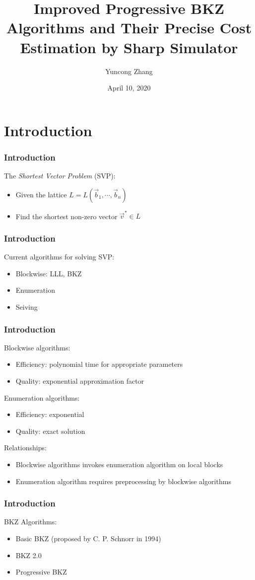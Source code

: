 \documentclass{beamer}
\title{Improved Progressive BKZ Algorithms and Their Precise Cost Estimation by Sharp Simulator}
\author{Yuncong Zhang}
\date{April 10, 2020}
\newcommand{\vb}{\vec{b}}
\newcommand{\vvs}{\vec{v}^*}
\begin{document}
\frame{\titlepage}

\frame{\tableofcontents}

\section{Introduction}
\frame
{
  \frametitle{Introduction}
  The \emph{Shortest Vector Problem} (SVP):
  \begin{itemize}
  	\item Given the lattice $L=L(\vb_1,\cdots,\vb_n)$
  	\item Find the shortest non-zero vector $\vvs\in L$
  \end{itemize}
}

\frame
{
  \frametitle{Introduction}
  Current algorithms for solving SVP:
  \begin{itemize}
  	\item Blockwise: LLL, BKZ
  	\item Enumeration
  	\item Seiving
  \end{itemize}
}

\frame
{
  \frametitle{Introduction}
  Blockwise algorithms:
  \begin{itemize}
  	\item Efficiency: polynomial time for appropriate parameters
  	\item Quality: exponential approximation factor
  \end{itemize}
  Enumeration algorithms:
  \begin{itemize}
  	\item Efficiency: exponential
  	\item Quality: exact solution
  \end{itemize}
  Relationships:
  \begin{itemize}
  	\item Blockwise algorithms invokes enumeration algorithm on local blocks
  	\item Enumeration algorithm requires preprocessing by blockwise algorithms
  \end{itemize}
}

\frame
{
  \frametitle{Introduction}
  BKZ Algorithms:
  \begin{itemize}
  	\item Basic BKZ (proposed by C. P. Schnorr in 1994)
  	\item BKZ 2.0
  	\item Progressive BKZ
  \end{itemize}
}
\end{document}
